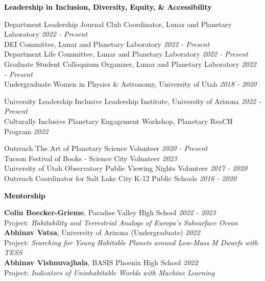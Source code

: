 \documentclass{resume} %
\newcommand{\mystrut}{\rule[-.3\baselineskip]{0pt}{\baselineskip}}
\renewenvironment{rSection}[1]{\mystrut{\textcolor{black}{{\large{\textbf{#1}}}}}
\vspace{-5pt} %
\begin{list}{}{
\setlength{\leftmargin}{0em}
}
\item[]
}{
\end{list}
}
\begin{document}
\begin{rSection}{Leadership in Inclusion, Diversity, Equity, \& Accessibility} 
\begin{rSubsection}{Department Leadership}{}{}{}
{Journal Club Coordinator, Lunar and Planetary Laboratory \hfill {\em 2022 - Present}}\\
{DEI Committee, Lunar and Planetary Laboratory \hfill {\em 2022 - Present}}\\
{Department Life Committee, Lunar and Planetary Laboratory \hfill {\em 2022 - Present}}\\
{Graduate Student Colloquium Organizer, Lunar and Planetary Laboratory \hfill {\em 2022 - Present}}\\
{Undergraduate Women in Physics \& Astronomy, University of Utah \hfill {\em 2018 - 2020}}
\end{rSubsection}
\begin{rSubsection}{University Leadership}{}{}{}
{Inclusive Leadership Institute, University of Arizona \hfill {\em 2022 - Present}}\\
{Culturally Inclusive Planetary Engagement Workshop, Planetary ReaCH Program \hfill {\em 2022}}
\end{rSubsection}
\begin{rSubsection}{Outreach}{}{}{}
{The Art of Planetary Science Volunteer \hfill {\em 2020 - Present}}\\
{Tucson Festival of Books - Science City Volunteer \hfill {\em 2023}}\\
{University of Utah Observatory Public Viewing Nights Volunteer \hfill {\em 2017 - 2020}}\\
{Outreach Coordinator for Salt Lake City K-12 Public Schools \hfill {\em 2016 - 2020}}
\end{rSubsection}
\end{rSection}
\vspace{10pt}\hline
\vspace{0pt}

\begin{rSection}{Mentorship} 
{\bf Colin Boecker-Grieme}, Paradise Valley High School \hfill {\em 2022 - 2023} \\
{Project: \textit{Habitability and Terrestrial Analogs of Europa's Subsurface Ocean}}\\
{\bf Abhinav Vatsa}, University of Arizona (Undergraduate) \hfill {\em 2022} \\
{Project: \textit{Searching for Young Habitable Planets around Low-Mass M Dwarfs with TESS}}\\
{\bf Abhinav Vishnuvajhala}, BASIS Phoenix High School \hfill {\em 2022} \\
{Project: \textit{Indicators of Uninhabitable Worlds with Machine Learning}}
\end{rSection}
\end{document}
